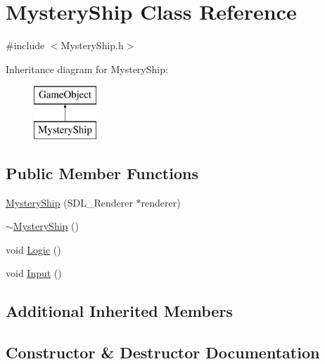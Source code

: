\hypertarget{class_mystery_ship}{}\section{Mystery\+Ship Class Reference}
\label{class_mystery_ship}


{\ttfamily \#include $<$Mystery\+Ship.\+h$>$}

Inheritance diagram for Mystery\+Ship\+:\begin{figure}[H]
\begin{center}
\leavevmode
\includegraphics[height=2.000000cm]{class_mystery_ship}
\end{center}
\end{figure}
\subsection*{Public Member Functions}
\begin{DoxyCompactItemize}
\item 
\mbox{\hyperlink{class_mystery_ship_a0ba2e990784b0e4c1be1a4dc4a7c47c7}{Mystery\+Ship}} (S\+D\+L\+\_\+\+Renderer $\ast$renderer)
\item 
\mbox{\hyperlink{class_mystery_ship_a4396e9190999aa5b2879b4886d11814c}{$\sim$\+Mystery\+Ship}} ()
\item 
void \mbox{\hyperlink{class_mystery_ship_ace0406106086ab58d8da318e902ade0a}{Logic}} ()
\item 
void \mbox{\hyperlink{class_mystery_ship_ad79eee772a091f9ea2b194744450e5f2}{Input}} ()
\end{DoxyCompactItemize}
\subsection*{Additional Inherited Members}


\subsection{Constructor \& Destructor Documentation}
\mbox{\label{class_mystery_ship_a0ba2e990784b0e4c1be1a4dc4a7c47c7}} 
